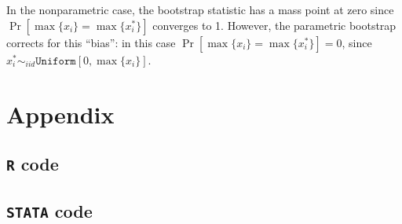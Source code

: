 \documentclass[12pt]{article}
\begin{document}
\subsection{} In the nonparametric case, the bootstrap statistic has a mass point at zero since $\Pr[\max\{x_i\} = \max\{x_i^*\}]$ converges to 1. However, the parametric bootstrap corrects for this ``bias'': in this case $\Pr[\max\{x_i\} = \max\{x_i^*\}] = 0$, since $x_i^* \sim_{iid} \texttt{Uniform}[0,\max\{x_i\}].$

\newpage

\section{Appendix}

\subsection{\texttt{R} code}
\subsection{\texttt{STATA} code}
\end{document}
